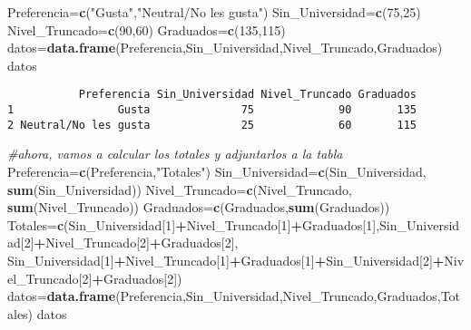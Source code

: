 \documentclass[
  a4paper,
  oneside,
  openany]{book}
\newenvironment{Shaded}{\begin{snugshade}}{\end{snugshade}}
\newcommand{\CommentTok}[1]{\textcolor[rgb]{0.56,0.35,0.01}{\textit{#1}}}
\newcommand{\DecValTok}[1]{\textcolor[rgb]{0.00,0.00,0.81}{#1}}
\newcommand{\KeywordTok}[1]{\textcolor[rgb]{0.13,0.29,0.53}{\textbf{#1}}}
\newcommand{\NormalTok}[1]{#1}
\newcommand{\OperatorTok}[1]{\textcolor[rgb]{0.81,0.36,0.00}{\textbf{#1}}}
\newcommand{\StringTok}[1]{\textcolor[rgb]{0.31,0.60,0.02}{#1}}
\begin{document}
\begin{Shaded}
\begin{Highlighting}[]
\NormalTok{Preferencia=}\KeywordTok{c}\NormalTok{(}\StringTok{"Gusta"}\NormalTok{,}\StringTok{"Neutral/No les gusta"}\NormalTok{)}
\NormalTok{Sin\_Universidad=}\KeywordTok{c}\NormalTok{(}\DecValTok{75}\NormalTok{,}\DecValTok{25}\NormalTok{)}
\NormalTok{Nivel\_Truncado=}\KeywordTok{c}\NormalTok{(}\DecValTok{90}\NormalTok{,}\DecValTok{60}\NormalTok{)}
\NormalTok{Graduados=}\KeywordTok{c}\NormalTok{(}\DecValTok{135}\NormalTok{,}\DecValTok{115}\NormalTok{)}
\NormalTok{datos=}\KeywordTok{data.frame}\NormalTok{(Preferencia,Sin\_Universidad,Nivel\_Truncado,Graduados)}
\NormalTok{datos}
\end{Highlighting}
\end{Shaded}

\begin{verbatim}
           Preferencia Sin_Universidad Nivel_Truncado Graduados
1                Gusta              75             90       135
2 Neutral/No les gusta              25             60       115
\end{verbatim}

\begin{Shaded}
\begin{Highlighting}[]
\CommentTok{\#ahora, vamos a calcular los totales y adjuntarlos a la tabla}
\NormalTok{Preferencia=}\KeywordTok{c}\NormalTok{(Preferencia,}\StringTok{"Totales"}\NormalTok{)}
\NormalTok{Sin\_Universidad=}\KeywordTok{c}\NormalTok{(Sin\_Universidad, }\KeywordTok{sum}\NormalTok{(Sin\_Universidad))}
\NormalTok{Nivel\_Truncado=}\KeywordTok{c}\NormalTok{(Nivel\_Truncado, }\KeywordTok{sum}\NormalTok{(Nivel\_Truncado))}
\NormalTok{Graduados=}\KeywordTok{c}\NormalTok{(Graduados,}\KeywordTok{sum}\NormalTok{(Graduados))}
\NormalTok{Totales=}\KeywordTok{c}\NormalTok{(Sin\_Universidad[}\DecValTok{1}\NormalTok{]}\OperatorTok{+}\NormalTok{Nivel\_Truncado[}\DecValTok{1}\NormalTok{]}\OperatorTok{+}\NormalTok{Graduados[}\DecValTok{1}\NormalTok{],Sin\_Universidad[}\DecValTok{2}\NormalTok{]}\OperatorTok{+}\NormalTok{Nivel\_Truncado[}\DecValTok{2}\NormalTok{]}\OperatorTok{+}\NormalTok{Graduados[}\DecValTok{2}\NormalTok{],}
\NormalTok{           Sin\_Universidad[}\DecValTok{1}\NormalTok{]}\OperatorTok{+}\NormalTok{Nivel\_Truncado[}\DecValTok{1}\NormalTok{]}\OperatorTok{+}\NormalTok{Graduados[}\DecValTok{1}\NormalTok{]}\OperatorTok{+}\NormalTok{Sin\_Universidad[}\DecValTok{2}\NormalTok{]}\OperatorTok{+}\NormalTok{Nivel\_Truncado[}\DecValTok{2}\NormalTok{]}\OperatorTok{+}\NormalTok{Graduados[}\DecValTok{2}\NormalTok{])}
\NormalTok{datos=}\KeywordTok{data.frame}\NormalTok{(Preferencia,Sin\_Universidad,Nivel\_Truncado,Graduados,Totales)}
\NormalTok{datos}
\end{Highlighting}
\end{Shaded}
\end{document}
